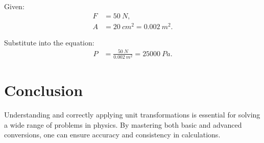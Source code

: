 \documentclass{article}
\begin{document}
Given:
\begin{align*}
F &= \SI{50}{N}, \\
A &= \SI{20}{cm^2} = \SI{0.002}{m^2}.
\end{align*}

Substitute into the equation:
\begin{align*}
P &= \frac{\SI{50}{N}}{\SI{0.002}{m^2}} = \SI{25000}{Pa}.
\end{align*}

\section*{Conclusion}
Understanding and correctly applying unit transformations is essential for solving a wide range of problems in physics. By mastering both basic and advanced conversions, one can ensure accuracy and consistency in calculations.
\end{document}
